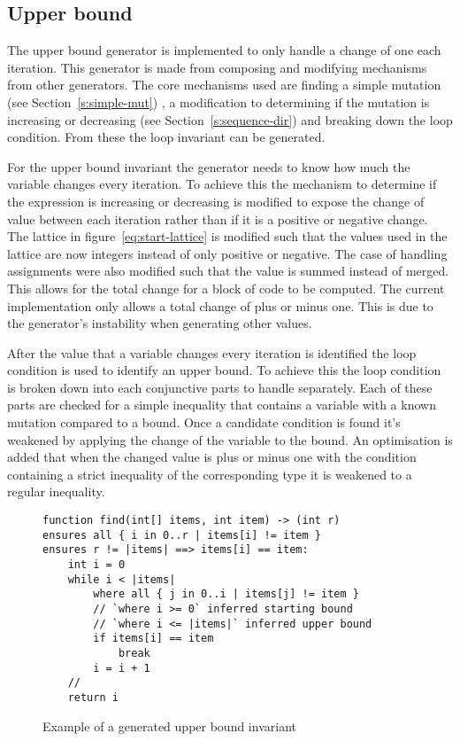 \subsection{Upper bound}\label{s:upper-bound-impl}

The upper bound generator is implemented to only handle a change of one each iteration.
This generator is made from composing and modifying mechanisms from other generators.
The core mechanisms used are finding a simple mutation (see Section~\ref{s:simple-mut}) ,
a modification to determining if the mutation is increasing or decreasing (see Section~\ref{s:sequence-dir})
and breaking down the loop condition.
From these the loop invariant can be generated.

For the upper bound invariant the generator needs to know how much the variable changes
every iteration. 
To achieve this the mechanism to determine if the expression is increasing or decreasing is
modified to expose the change of value between each iteration rather than if it is a positive or
negative change.
The lattice in figure~\ref{eq:start-lattice} is modified such that the values used in the lattice
are now integers instead of only positive or negative.
The case of handling assignments were also modified such that the value is summed instead of merged.
This allows for the total change for a block of code to be computed.
The current implementation only allows a total change of plus or minus one.
This is due to the generator's instability when generating other values.

After the value that a variable changes every iteration is identified the loop
condition is used to identify an upper bound.
To achieve this the loop condition is broken down into each conjunctive parts to handle
separately.
Each of these parts are checked for a simple inequality that contains a variable
with a known mutation compared to a bound.
Once a candidate condition is found it's weakened by applying the change of the variable
to the bound.
An optimisation is added that when the changed value is plus or minus one with the condition containing
a strict inequality of the corresponding type it is weakened to a regular inequality.

\begin{figure}
\begin{lstlisting}
function find(int[] items, int item) -> (int r)
ensures all { i in 0..r | items[i] != item }
ensures r != |items| ==> items[i] == item:
	int i = 0
	while i < |items|
		where all { j in 0..i | items[j] != item }
		// `where i >= 0` inferred starting bound
		// `where i <= |items|` inferred upper bound
		if items[i] == item
			break
		i = i + 1
	//
	return i
\end{lstlisting}
\caption{Example of a generated upper bound invariant}
\label{lst:whiley-upper-bound}
\end{figure}

